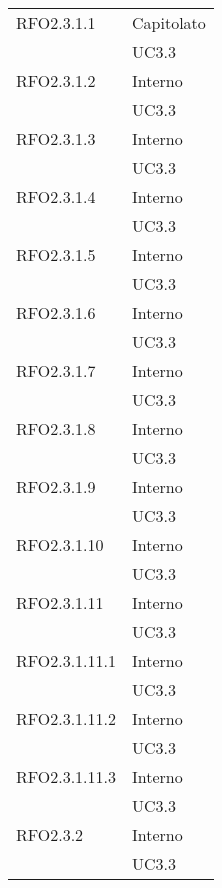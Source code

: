 \begin{center}
\begin{longtable}{ | >{\centering\arraybackslash}m{5cm} | >{\centering\arraybackslash}m{5cm} | }
        RFO2.3.1.1 & Capitolato\\
            & UC3.3 \\
\hline

        RFO2.3.1.2 & Interno\\
            & UC3.3 \\
\hline

        RFO2.3.1.3 & Interno\\
            & UC3.3 \\
\hline

        RFO2.3.1.4 & Interno\\
            & UC3.3 \\
\hline

        RFO2.3.1.5 & Interno\\
            & UC3.3 \\
\hline

        RFO2.3.1.6 & Interno\\
            & UC3.3 \\
\hline

        RFO2.3.1.7 & Interno\\
            & UC3.3 \\
\hline

        RFO2.3.1.8 & Interno\\
            & UC3.3 \\
\hline

        RFO2.3.1.9 & Interno\\
            & UC3.3 \\
\hline

        RFO2.3.1.10 & Interno\\
            & UC3.3 \\
\hline

        RFO2.3.1.11 & Interno\\
            & UC3.3 \\
\hline

        RFO2.3.1.11.1 & Interno\\
            & UC3.3 \\
\hline

        RFO2.3.1.11.2 & Interno\\
            & UC3.3 \\
\hline

        RFO2.3.1.11.3 & Interno\\
            & UC3.3 \\
\hline

        RFO2.3.2 & Interno\\
            & UC3.3 \\
\hline


\end{longtable}
\end{center}
